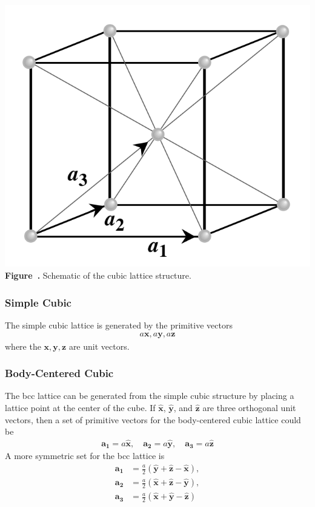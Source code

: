 \begin{center}
	\begin{minipage}{0.4\textwidth}
		\centering
		\includegraphics[width=\textwidth]{img/cubic_lattice.png}
		\\[0.5em]
		\textbf{Figure~\thefigure.} Schematic of the cubic lattice structure.
		\label{fig:cubic_lattice}
	\end{minipage}
\end{center}

\subsubsection{Simple Cubic}
The simple cubic lattice is generated by the primitive vectors
\begin{align*}
	a\mathbf{x}, a\mathbf{y}, a\mathbf{z}
\end{align*}
where the $\mathbf{x}, \mathbf{y}, \mathbf{z}$ are unit vectors.

\subsubsection{Body-Centered Cubic}
The bcc lattice can be generated from the simple cubic structure by placing a lattice point at the center of the cube. If $\mathbf{\hat{x}}$, $\mathbf{\hat{y}}$, and $\mathbf{\hat{z}}$ are three orthogonal unit vectors, then a set of primitive vectors for the body-centered cubic lattice could be
\begin{align*}
	\mathbf{a_1} = a\mathbf{\hat{x}}, \quad \mathbf{a_2} = a\mathbf{\hat{y}}, \quad \mathbf{a_3} = a\mathbf{\hat{z}}
\end{align*}
A more symmetric set for the bcc lattice is
\begin{align*}
	\mathbf{a_1} & = \frac{a}{2}(\mathbf{\hat{y}} + \mathbf{\hat{z}} - \mathbf{\hat{x}}), \\
	\mathbf{a_2} & = \frac{a}{2}(\mathbf{\hat{x}} + \mathbf{\hat{z}} - \mathbf{\hat{y}}), \\
	\mathbf{a_3} & = \frac{a}{2}(\mathbf{\hat{x}} + \mathbf{\hat{y}} - \mathbf{\hat{z}})
\end{align*}


